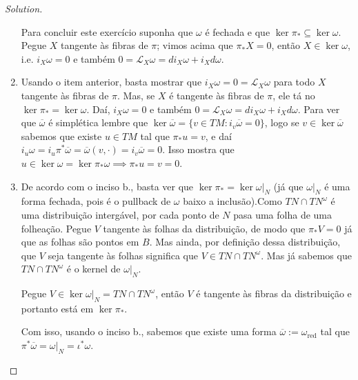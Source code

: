 \begin{proof}[Solution]
\begin{enumerate}[label=\alph*.]
\vspace{1em}
Para concluir este exercício suponha que $\omega$ é fechada e que $\ker \pi_*\subseteq \ker \omega$. Pegue $X$ tangente às fibras de $\pi$; vimos acima que $\pi_*X=0$, então $X\in\ker \omega$, i.e. $i_X\omega=0$ e também $0=\mathcal{L}_{X}\omega =di_X\omega+i_Xd\omega$.

\item Usando o item anterior, basta mostrar que $i_X\omega =0=\mathcal{L}_{X}\omega$ para todo $X$ tangente às fibras de $\pi$. Mas, se $X$ é tangente às fibras de $\pi$, ele tá no $\ker \pi_*=\ker \omega$. Daí, $i_X\omega=0$ e também $0=\mathcal{L}_{X}\omega=di_X\omega+i_Xd\omega$. Para ver que $\overline{\omega}$ é simplética lembre que $\ker \overline{\omega}=\{v\in TM: i_{v}\overline{\omega}=0\}$, logo se $v\in\ker \overline{\omega}$ sabemos que existe $u\in TM$ tal que $\pi_*u=v$, e daí $i_u\omega=i_u\pi^*\overline{\omega}=\overline{\omega}(v,\cdot )=i_v\overline{\omega}=0$. Isso mostra que $u\in\ker \omega=\ker \pi_*\omega\implies \pi_*u=v=0$.

	\item De acordo com o inciso b., basta ver que $\ker \pi_*=\ker \omega|_{N}$ (já que $\omega|_{N}$ é uma forma fechada, pois é o pullback de $\omega$ baixo a inclusão).Como $TN\cap TN^\omega$ é uma distribuição intergável, por cada ponto de $N$ pasa uma folha de uma folheação. Pegue $V$ tangente às folhas da distribuição, de modo que  $\pi_*V=0$ já que as folhas são pontos em $B$. Mas ainda, por definição dessa distribuição, que $V$ seja tangente às folhas significa que $V\in TN\cap TN^\omega$. Mas já sabemos que $TN\cap TN^{\omega}$ é o kernel de $\omega|_{N}$.

		Pegue $V\in\ker \omega |_{N}=TN\cap TN^\omega$, então $V$ é tangente às fibras da distribuição e portanto está em $\ker \pi_*$.

		Com isso, usando o inciso b., sabemos que existe uma forma  $\overline{\omega}:=\omega_{\operatorname{red}}$ tal que $\pi^*\overline{\omega}=\omega|_{N}=\iota^*\omega$.

\end{enumerate}	
\end{proof}


